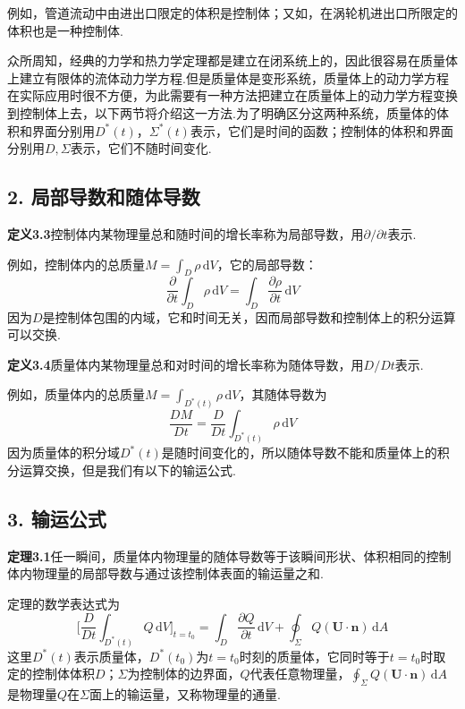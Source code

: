 例如，管道流动中由进出口限定的体积是控制体；又如，在涡轮机进出口所限定的体积也是一种控制体.

众所周知，经典的力学和热力学定理都是建立在闭系统上的，因此很容易在质量体上建立有限体的流体动力学方程.但是质量体是变形系统，质量体上的动力学方程在实际应用时很不方便，为此需要有一种方法把建立在质量体上的动力学方程变换到控制体上去，以下两节将介绍这一方法.为了明确区分这两种系统，质量体的体积和界面分别用$D^{*}(t)$，$\Sigma^{*}(t)$表示，它们是时间的函数；控制体的体积和界面分别用$D,\Sigma$表示，它们不随时间变化.

\subsection*{2. 局部导数和随体导数}

\noindent\textbf{定义3.3}\quad 控制体内某物理量总和随时间的增长率称为局部导数，用$\partial/\partial t$表示.

例如，控制体内的总质量$M=\displaystyle\int_D \rho\,\mathrm{d}V$，它的局部导数：
\begin{equation*}
\frac{\partial}{\partial t}\int_D \rho\,\mathrm{d}V=\int_D \frac{\partial\rho}{\partial t}\,\mathrm{d}V
\tag{3.1}
\end{equation*}
因为$D$是控制体包围的内域，它和时间无关，因而局部导数和控制体上的积分运算可以交换.

\noindent\textbf{定义3.4}\quad 质量体内某物理量总和对时间的增长率称为随体导数，用$D/Dt$表示.

例如，质量体内的总质量$M=\displaystyle\int_{D^{*}(t)}\rho\,\mathrm{d}V$，其随体导数为
\begin{equation*}
\frac{DM}{Dt}=\frac{D}{Dt}\int_{D^{*}(t)}\rho\,\mathrm{d}V
\tag{3.2}
\end{equation*}
因为质量体的积分域$D^{*}(t)$是随时间变化的，所以随体导数不能和质量体上的积分运算交换，但是我们有以下的输运公式.

\subsection*{3. 输运公式}

\noindent\textbf{定理3.1}\quad 任一瞬间，质量体内物理量的随体导数等于该瞬间形状、体积相同的控制体内物理量的局部导数与通过该控制体表面的输运量之和.

定理的数学表达式为
\begin{equation*}
\bigg[\frac{D}{Dt}\int_{D^{*}(t)}Q\,\mathrm{d}V\bigg]_{t=t_0}=\int_D \frac{\partial Q}{\partial t}\,\mathrm{d}V+\oint_\Sigma Q(\boldsymbol{U}\cdot\boldsymbol{n})\,\mathrm{d}A
\tag{3.3}
\end{equation*}
这里$D^{*}(t)$表示质量体，$D^{*}(t_0)$为$t=t_0$时刻的质量体，它同时等于$t=t_0$时取定的控制体体积$D$；$\Sigma$为控制体的边界面，$Q$代表任意物理量，$\displaystyle\oint_\Sigma Q(\boldsymbol{U}\cdot\boldsymbol{n})\,\mathrm{d}A$是物理量$Q$在$\Sigma$面上的输运量，又称物理量的通量.

